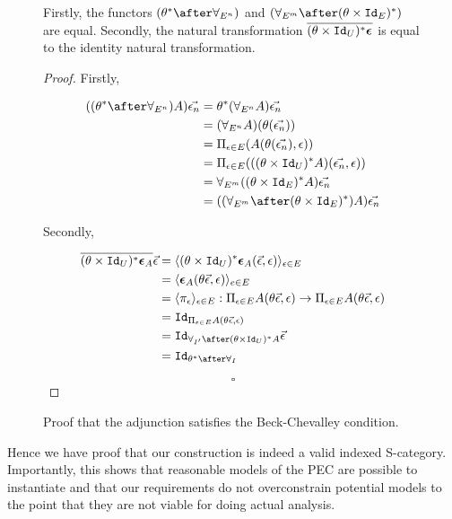 \documentclass{Report}
\begin{document}
\begin{figure}
    \begin{framed}
        
\begin{theorem}
    Firstly, the functors $(\theta\star\after\allEn)$ and $(\allEm\after(\theta\times\Id{E})\star)$ are equal. Secondly, the natural transformation $\overline{(\theta\times\texttt{Id}_{U})^* \boldsymbol{\epsilon}_{}}$ is equal to the identity natural transformation.
\end{theorem}

    \begin{proof}

        Firstly,

    \begin{align*}
    ((\theta\star\after\allEn)A)\env &= \theta\star(\allEn  A)\env\\
        &= (\allEn A)(\theta(\env))\\
        &= \Pi_{\e\in E}(A(\theta(\env), \e))\\
    &= \Pi_{\e\in E}(((\theta\times \Id{U})\star A)(\env,   \e))\\
        &= \allEm((\theta\times\Id{E})\star A)\env\\
        &= ((\allEm\after(\theta\times\Id{E})\star)A)\env
    \end{align*}

Secondly,
    
\begin{align*}
    \bar{(\theta\times\Id{U})\star \counit{A}} \ev  & = \finpr{(\theta\times\Id{U})\star\counit{A}(\ev, \e)}{\e\in E}\\
    & = \finpr{\counit{A}(\theta\ev, \e)}{e\in E}\\
    & = \finpr{\pi_\e}{\e\in E}: \Pi_{\e\in E}A(\theta\ev, \e) \rightarrow \Pi_{\e\in E}A(\theta\ev, \e)\\
    & = \Id{\Pi_{\e\in E}A(\theta\ev, \e)}\\
    & = \Id{\allII\after(\theta\times\Id{U})\star A}\ev\\
    & = \Id{\theta\star\after\allI}
\end{align*}

    $$\square$$
    \end{proof}
    \end{framed}
    \caption{Proof that the adjunction satisfies the Beck-Chevalley condition.}
    \label{BeckChevalley1}
\end{figure}

Hence we have proof that our construction is indeed a valid indexed S-category. Importantly, this shows that reasonable models of the PEC are possible to instantiate and that our requirements do not overconstrain potential models to the point that they are not viable for doing actual analysis.
\end{document}
